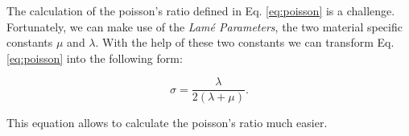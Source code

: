 The calculation of the poisson's ratio defined in Eq. \ref{eq:poisson} is a challenge. Fortunately, we can make use of the \textit{Lamé Parameters}, the two material specific constants $\mu$ and $\lambda$. With the help of these two constants we can transform Eq. \ref{eq:poisson} into the following form:

\begin{equation}\label{eq:poisson_ratio}
\sigma =  \frac{\lambda}{2(\lambda + \mu)}.
\end{equation}

This equation allows to calculate the poisson's ratio much easier. 







